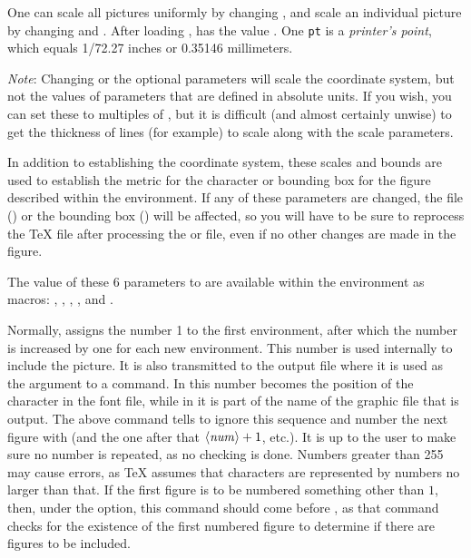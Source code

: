 \documentclass[letterpaper]{article}
\begin{document}
One can scale all pictures uniformly by changing , and
scale an individual picture by changing  and .
After loading \mfp{},  has the value \dim{1pt}. One
\texttt{pt} is a \emph{printer's point}, which equals 1/72.27 inches or
0.35146 millimeters.

\emph{Note}: Changing  or the optional parameters will
scale the coordinate system, but not the values of parameters that are
defined in absolute units. If you wish, you can set these to multiples
of , but it is difficult (and almost certainly unwise) to
get the thickness of lines (for example) to scale along with the scale
parameters.

In addition to establishing the coordinate system, these scales and
bounds are used to establish the metric for the \MF{} character or
bounding box for the \MP{} figure described within the environment. If
any of these parameters are changed, the  file (\MF{}) or the
bounding box (\MP{}) will be affected, so you will have to be sure to
reprocess the \TeX{} file after processing the  or 
file, even if no other changes are made in the figure.

The value of these 6 parameters to  are available within the
environment as macros: , , , ,
 and .

\begin{cd}
%
\end{cd}

Normally,  assigns the number 1 to the first 
environment, after which the number is increased by one for each new
 environment. This number is used internally to include the
picture. It is also transmitted to the output file where it is used as
the argument to a  command. In \MF{} this number becomes
the position of the character in the font file, while in \MP{} it is
part of the name of the graphic file that is output. The above command
tells \mfp{} to ignore this sequence and number the next 
figure with  (and the one after that $\langle\mbox{\rmfamily\itshape num\/}\rangle+1$, etc.). It
is up to the user to make sure no number is repeated, as no checking is
done. Numbers greater than 255 may cause errors, as \TeX{} assumes that
characters are represented by numbers no larger than that. If the first
figure is to be numbered something other than $1$, then, under the
 option, this command should come before
, as that command checks for the existence of the
first numbered figure to determine if there are figures to be included.
\end{document}
